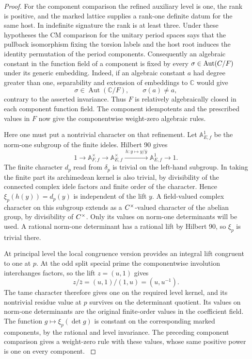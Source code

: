 \begin{proof}
For the component comparison the refined auxiliary level is
one, the rank is positive, and the marked lattice supplies a
rank-one definite datum for the same host. In indefinite
signature the rank is at least three. Under these hypotheses
the CM comparison for the unitary period spaces says that the
pullback isomorphism fixing the torsion labels and the host
root induces the identity permutation of the period
components. Consequently an algebraic constant in the
function field of a component is fixed by every
\(\sigma\in\operatorname{Aut}(C/F)\) under its generic
embedding. Indeed, if an algebraic constant \(a\) had degree greater than one, separability and extension of embeddings to \(\mathbb C\) would give
\[
 \sigma\in\operatorname{Aut}(\mathbb C/F),\qquad \sigma(a)\ne a,
\]
contrary to the asserted invariance. Thus \(F\) is relatively algebraically closed in
each component function field. The component idempotents and
the prescribed values in \(F\) now give the componentwise
weight-zero algebraic rules.
\label{cor:split-level-sections-2}

Here one must put a nontrivial character on that refinement.
Let \(\mathbb A_{E,f}^1\) be the norm-one subgroup of the
finite ideles. Hilbert 90 gives
\[
 1\longrightarrow\mathbb A_{F,f}^\times
 \longrightarrow\mathbb A_{E,f}^\times
 \xrightarrow{\,h:y\mapsto y/\bar y\,}\mathbb A_{E,f}^1
 \longrightarrow1 .
\]
The finite character \(d_p\) read from \(\delta_p\) is trivial on
the left-hand subgroup. In taking the finite part its
archimedean kernel is also trivial, by divisibility of the
connected complex idele factors and finite order of the
character. Hence \(\xi_p(h(y))=d_p(y)\) is independent of the
lift \(y\). A field-valued complex character on this
subgroup extends as a \(C^\times\)-valued character of the
abelian group, by divisibility of \(C^\times\). Only its values
on norm-one determinants will be used. A rational norm-one
determinant has a rational lift by Hilbert 90, so \(\xi_p\)
is trivial there.

At principal level the local congruence
version provides an integral lift congruent to one at \(p\).
At the odd split special prime the componentwise involution interchanges factors, so the lift \(z=(u,1)\) gives
\[
 z/\bar z=(u,1)/(1,u)=(u,u^{-1}).
\] The tame
character therefore gives one on the required level kernel,
and its nontrivial residue value at \(p\) survives on the
determinant quotient. Its values on norm-one determinants are
the original finite-order values in the coefficient field.
The function \(g\mapsto\xi_p(\det g)\) is constant on the
corresponding marked components, by the rational and level
invariance. The preceding component comparison gives a
weight-zero rule with these values, whose same positive power
is one on every component.
\label{cor:split-level-sections-3}


\end{proof}
